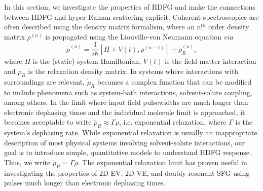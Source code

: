 \documentclass[aip, jcp, reprint, onecolumn, nofootinbib]{revtex4-2}
\begin{document}
In this section, we investigate the properties of HDFG and make the connections between HDFG and hyper-Raman scattering explicit.
Coherent spectroscopies are often described using the density matrix formalism, where an n$^{th}$ order density matrix $\rho^{(n)}$ is propagated using the Liouville-von Neumann equation $via$
\begin{equation}\label{LVNE}
	\dot{\rho}^{(n)} = \frac{1}{i \hbar} [H + V(t), \rho^{(n-1)}] + \dot{\rho}^{(n)}_R,
\end{equation}
where $H$ is the (static) system Hamiltonian, $V(t)$ is the field-matter interaction and $\rho_R$ is the relaxation density matrix. \cite{RN455}
In systems where interactions with surroundings are relevant, $\dot{\rho}_R$ becomes a complex function that can be modified to include phenomena such as system-bath interactions, solvent-solute coupling, among others. \cite{Sung2001}
In the limit where input field pulsewidths are much longer than electronic dephasing times and the individual molecule limit is approached, it becomes acceptable to write $\dot{\rho}_R \approx \Gamma \rho$, i.e. exponential relaxation, where $\Gamma$ is the system's dephasing rate. \cite{RN455, Sue1986, Sung2001}
While exponential relaxation is usually an inappropriate description of most physical systems involving solvent-solute interactions,\cite{Sue1986, Yan1988, Li1994, Myers1997} our goal is to introduce simple, quantitative models to understand HDFG response.
Thus, we write $\dot{\rho}_R = \Gamma \rho$.
The exponential relaxation limit has proven useful in investigating the properties of 2D-EV, 2D-VE, and doubly resonant SFG using pulses much longer than electronic dephasing times. \cite{Raschke2002, Gaynor2017}
\end{document}
